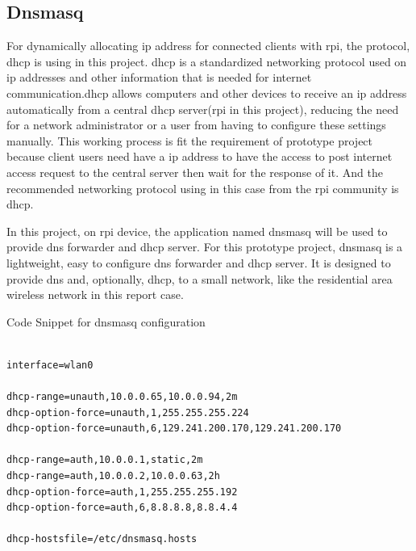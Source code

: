 \subsection{Dnsmasq}
\par For dynamically allocating \gls{ip} address for connected clients with \gls{rpi}, the protocol, \gls{dhcp} \cite{dhcp} is using in this project. \gls{dhcp} is a standardized networking protocol used on \gls{ip} addresses and other information that is needed for internet communication.\gls{dhcp} allows computers and other devices to receive an \gls{ip} address automatically from a central \gls{dhcp} server(\gls{rpi} in this project), reducing the need for a network administrator or a user from having to configure these settings manually. This working process is fit the requirement of prototype project because client users need have a \gls{ip} address to have the access to post internet access request to the central server then wait for the response of it. And the recommended networking protocol using in this case from the \gls{rpi} community is \gls{dhcp}.
\par In this project, on \gls{rpi} device, the application named dnsmasq \cite{dnsmasq} will be used to provide \gls{dns} forwarder and \gls{dhcp} server. For this prototype project, dnsmasq is a lightweight, easy to configure \gls{dns} forwarder and \gls{dhcp} server. It is designed to provide \gls{dns} and, optionally, \gls{dhcp}, to a small network, like the residential area wireless network in this report case.

\begin{algorithm}[h]
  \caption{Code Snippet for dnsmasq configuration}
  \label{code:dnsmasq_config}
  \begin{verbatim}
  
interface=wlan0

dhcp-range=unauth,10.0.0.65,10.0.0.94,2m
dhcp-option-force=unauth,1,255.255.255.224
dhcp-option-force=unauth,6,129.241.200.170,129.241.200.170

dhcp-range=auth,10.0.0.1,static,2m
dhcp-range=auth,10.0.0.2,10.0.0.63,2h
dhcp-option-force=auth,1,255.255.255.192
dhcp-option-force=auth,6,8.8.8.8,8.8.4.4

dhcp-hostsfile=/etc/dnsmasq.hosts
 \end{verbatim}
\end{algorithm}

